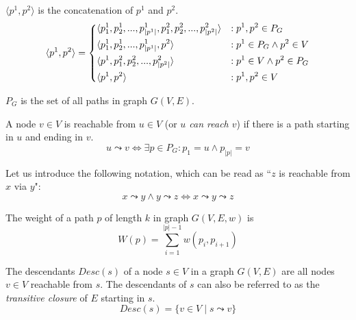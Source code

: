 \begin{definition}
    $\langle p^1, p^2 \rangle$ is the concatenation of $p^1$ and $p^2$.
    \begin{equation*}
        \langle p^1, p^2 \rangle = \begin{dcases}
            \langle p^1_1, p^1_2,...,p^1_{|p^1|}, p^2_1,p^2_2,...,p^2_{|p^2|} \rangle & : p^1,p^2 \in P_G \\
            \langle p^1_1, p^1_2,...,p^1_{|p^1|}, p^2                         \rangle & : p^1 \in P_G \wedge p^2 \in V \\
            \langle p^1, p^2_1, p^2_2,..., p^2_{|p^2|}                        \rangle & : p^1 \in V \wedge p^2 \in P_G \\
            \langle p^1, p^2                                                  \rangle & : p^1,p^2 \in V \\
        \end{dcases}
    \end{equation*}
\end{definition}
\begin{definition}
    $P_G$ is the set of all paths in graph $G(V,E)$.
\end{definition}
\begin{definition}[Reachability]
    A node $v \in V$ is reachable from $u \in V$ (or \emph{$u$ can reach $v$}) if there is a path starting in $u$ and ending in $v$.
    \begin{equation*}
        u \leadsto v \iff \exists p \in P_G \colon p_1 = u \wedge p_{|p|} = v
    \end{equation*}
\end{definition}
Let us introduce the following notation, which can be read as ``$z$ is reachable from $x$ via $y$":
\begin{equation*}
    x \leadsto y \wedge y \leadsto z \iff x \leadsto y \leadsto z
\end{equation*}
\begin{definition}
    The weight of a path $p$ of length $k$ in graph $G(V,E,w)$ is
    \begin{equation*}
        W(p) = \sum_{i=1}^{|p|-1}{w(p_i, p_{i+1})}
    \end{equation*}
\end{definition}
\begin{definition}[Descendants] \label{def:desc} The descendants $Desc(s)$ of a node $s \in V$ in a graph $G(V,E)$ are all nodes $v \in V$ reachable from $s$. The descendants of $s$ can also be referred to as the \emph{transitive closure} of $E$ starting in $s$.
    \begin{equation*}
        Desc(s) = \{v \in V \mid s \leadsto v\}
    \end{equation*}
\end{definition}
